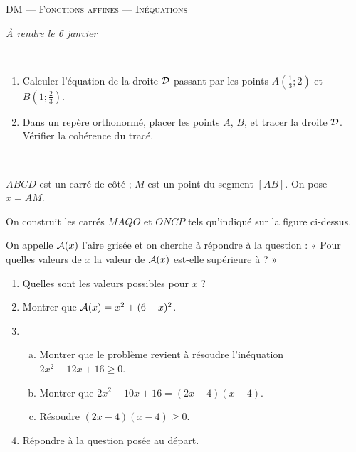 \documentclass[11pt]{article}
\begin{document}
\begin{center}
  {\large
    DM
    ---
    \textsc{Fonctions affines --- Inéquations}
  }
\end{center}

\emph{À rendre le 6 janvier}

\begin{exercice}~
  \begin{enumerate}[(1)]
    \item Calculer l'équation de la droite $\cal D$ passant par les points $A(\frac{1}{3}; 2)$ et $B(1; \frac{2}{3})$.
    \item Dans un repère orthonormé, placer les points $A$, $B$, et tracer la droite $\cal D$. Vérifier la cohérence du tracé.
  \end{enumerate}
\end{exercice}

\begin{exercice}[Problème]~

  \begin{center}
  \end{center}

    $ABCD$ est un carré de côté  ; $M$ est un point du segment $[AB]$. On pose $x=AM$.

    On construit les carrés $MAQO$ et $ONCP$ tels qu'indiqué sur la figure ci-dessus.

    On appelle ${\cal A}(x)$ l'aire grisée et on cherche à répondre à la question : « Pour quelles valeurs de $x$ la valeur de ${\cal A}(x)$ est-elle supérieure à  ? »

    \begin{enumerate}[(1)]
      \item Quelles sont les valeurs possibles pour $x$ ?
      \item Montrer que ${\cal A}(x)=x^2+(6-x)^2$.
      \item \begin{enumerate}[(a)]
          \item Montrer que le problème revient à résoudre l'inéquation $2x^2-12x+16\geq0$.
          \item Montrer que $2x^2-10x+16=(2x-4)(x-4)$.
          \item Résoudre $(2x-4)(x-4)\geq0$.
          \end{enumerate}
        \item Répondre à la question posée au départ.
    \end{enumerate}
\end{exercice}
\end{document}
